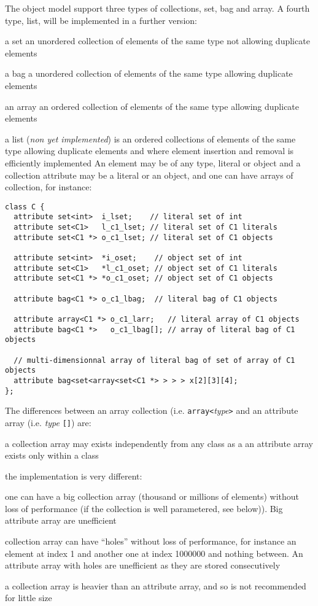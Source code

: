 The \eyedb object model support three types of collections, set, bag and array. A fourth type, list, will be implemented in a further version:
\bi
\item a set an unordered collection of elements of the same type
not allowing duplicate elements
\item a bag a unordered collection of elements of the same type
allowing duplicate elements
\item an array an ordered collection of elements of the same type
allowing duplicate elements
\item a list (\emph{non yet implemented}) is an ordered collections of elements of
the same type allowing duplicate elements
and where element insertion and removal is
efficiently implemented
\ei
An element may be of any type, literal or object and
a collection attribute may be a literal or an object, and one can have
arrays of collection, for instance:
\vspace{-0.2cm}
\begin{verbatim}
class C {
  attribute set<int>  i_lset;    // literal set of int
  attribute set<C1>   l_c1_lset; // literal set of C1 literals
  attribute set<C1 *> o_c1_lset; // literal set of C1 objects

  attribute set<int>  *i_oset;    // object set of int
  attribute set<C1>   *l_c1_oset; // object set of C1 literals
  attribute set<C1 *> *o_c1_oset; // object set of C1 objects

  attribute bag<C1 *> o_c1_lbag;  // literal bag of C1 objects

  attribute array<C1 *> o_c1_larr;   // literal array of C1 objects
  attribute bag<C1 *>   o_c1_lbag[]; // array of literal bag of C1 objects

  // multi-dimensionnal array of literal bag of set of array of C1 objects
  attribute bag<set<array<set<C1 *> > > > x[2][3][4]; 
};
\end{verbatim}
The differences between an array collection (i.e.
\texttt{array<}\emph{type}\texttt{>} and an attribute array (i.e. 
\emph{type} \texttt{[]}) are:
\bi
\item a collection array may exists independently from any class as a
an attribute array exists only within a class
\item the implementation is very different:
\bi
\item one can have a big collection array (thousand or millions of elements)
without loss of performance (if the collection is well parametered, see
below)). Big attribute array are unefficient
\item collection array can have ``holes'' without loss of performance, for instance an element at index 1 and another one at index 1000000 and nothing between. An attribute array with holes are unefficient as they are stored
consecutively
\item a collection array is heavier than an attribute array, and so is not
recommended for little size
\ei
\ei

